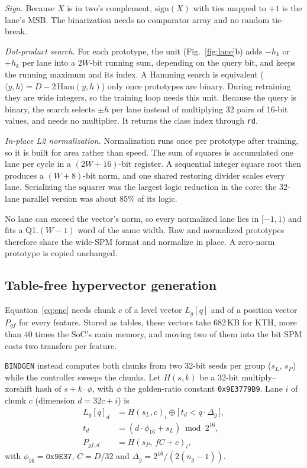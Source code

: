 \documentclass[conference]{IEEEtran}
\begin{document}
\emph{Sign.} Because $X$ is in two's complement, $\mathrm{sign}(X)$ with ties mapped to $+1$ is the lane's MSB. The binarization needs no comparator array and no random tie-break.

\emph{Dot-product search.} For each prototype, the unit (Fig.~\ref{fig:lane}b) adds $-h_k$ or $+h_k$ per lane into a $2W$-bit running sum, depending on the query bit, and keeps the running maximum and its index. A Hamming search is equivalent ($\langle y,h\rangle=D-2\,\mathrm{Ham}(y,h)$) only once prototypes are binary. During retraining they are wide integers, so the training loop needs this unit. Because the query is binary, the search selects $\pm h$ per lane instead of multiplying 32 pairs of 16-bit values, and needs no multiplier. It returns the class index through \texttt{rd}.

\emph{In-place L2 normalization.} Normalization runs once per prototype after training, so it is built for area rather than speed. The sum of squares is accumulated one lane per cycle in a $(2W{+}16)$-bit register. A sequential integer square root then produces a $(W{+}8)$-bit norm, and one shared restoring divider scales every lane. Serializing the squarer was the largest logic reduction in the core: the 32-lane parallel version was about 85\% of its logic.

No lane can exceed the vector's norm, so every normalized lane lies in $[-1,1)$ and fits a Q1.$(W{-}1)$ word of the same width. Raw and normalized prototypes therefore share the wide-SPM format and normalize in place. A zero-norm prototype is copied unchanged.

\subsection{Table-free hypervector generation}
\label{sec:gen}
Equation~\eqref{eq:enc} needs chunk $c$ of a level vector $L_g[q]$ and of a position vector $P_{gf}$ for every feature. Stored as tables, these vectors take 682\,KB for KTH, more than 40 times the SoC's main memory, and moving two of them into the bit SPM costs two transfers per feature.

\texttt{BINDGEN} instead computes both chunks from two 32-bit seeds per group ($s_L$, $s_P$) while the controller sweeps the chunks. Let $H(s,k)$ be a 32-bit multiply--xorshift hash of $s+k\cdot\phi$, with $\phi$ the golden-ratio constant \texttt{0x9E3779B9}. Lane $i$ of chunk $c$ (dimension $d=32c+i$) is
\begin{align}
L_g[q]_d &= H(s_L,c)_i \oplus \big[\,t_d < q\cdot\Delta_g\,\big], \nonumber\\
t_d &= (d\cdot\phi_{16}+s_L)\bmod 2^{16}, \nonumber\\
P_{gf,d} &= H(s_P,\,fC+c)_i, \nonumber
\end{align}
with $\phi_{16}=\texttt{0x9E37}$, $C=D/32$ and $\Delta_g=2^{16}/(2(n_g{-}1))$.
\end{document}

